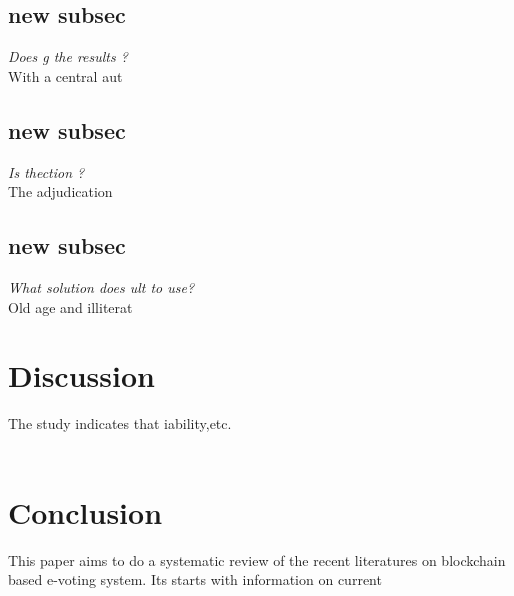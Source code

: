 \documentclass[12pt,a4paper]{article}%
\begin{document}
\begin{flushleft}
\begin{flushleft}
		\end{flushleft}
		\subsection{new subsec}
		\begin{flushleft}
			\justify
			\textit{Does g the results ?}\\
			
			With a central aut 
			
			
		\end{flushleft}
		
		\subsection{new subsec}
		\begin{flushleft}
			\justify
			\textit{Is thection ?}\\
			
			The adjudication  
			
		\end{flushleft}
		
		\subsection{new subsec }
		\begin{flushleft}
			\justify
			\textit{What solution does ult to use?}\\
			
			Old age and illiterat\\
			
		\end{flushleft}
	
	
	\end{flushleft}

	\pagebreak
	\section{Discussion}
	\justify
		The study indicates that iability,etc.\\ \\
		
	\pagebreak
	\section{Conclusion}
	\justify
		This paper aims to do a systematic review of the recent literatures on blockchain based e-voting system. Its starts with information on current 
\end{document}
